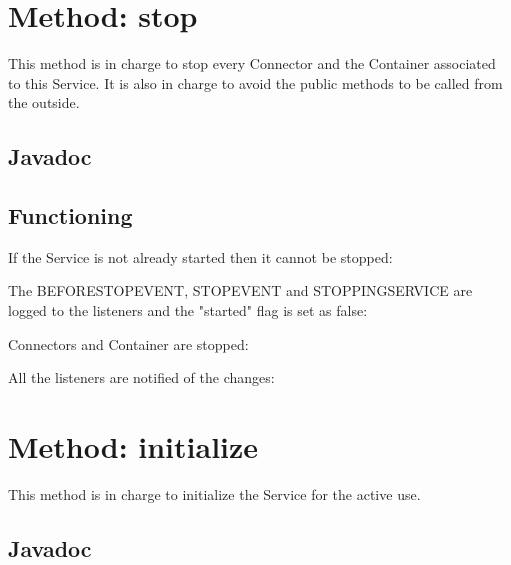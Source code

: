 \documentclass[../../codeInspection.tex]{subfiles}
\begin{document}
	\section{Method: stop}

		This method is in charge to stop every Connector and the Container associated to this Service. It is also in charge to avoid the public methods to be called from the outside.

		\subsection{Javadoc}
			

		\subsection{Functioning}

			If the Service is not already started then it cannot be stopped:
			

			The BEFORE\textunderscore STOP\textunderscore EVENT, STOP\textunderscore EVENT and STOPPING\textunderscore SERVICE are logged to the listeners and the "started" flag is set as false:
			

			Connectors and Container are stopped:
			
			

			All the listeners are notified of the changes:
			

	\section{Method: initialize}

		This method is in charge to initialize the Service for the active use.

		\subsection{Javadoc}
			
\end{document}
